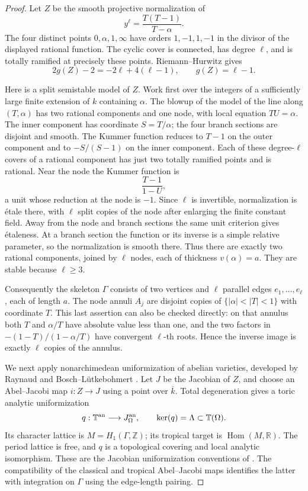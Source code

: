 \begin{proof}
Let $Z$ be the smooth projective normalization of
\[
 y^\ell=\frac{T(T-1)}{T-\alpha}.
\]
The four distinct points $0,\alpha,1,\infty$ have orders $1,-1,1,-1$
in the divisor of the displayed rational function. The cyclic cover
is connected, has degree $\ell$, and is totally ramified at precisely
these points. Riemann--Hurwitz gives
\[
 2g(Z)-2=-2\ell+4(\ell-1),\qquad g(Z)=\ell-1.
\]

Here is a split semistable model of $Z$. Work first over the integers
of a sufficiently large finite extension of $k$ containing $\alpha$.
The blowup of the model of the line along $(T,\alpha)$ has two rational
components and one node, with local equation $TU=\alpha$. The inner
component has coordinate $S=T/\alpha$; the four branch sections are
disjoint and smooth. The Kummer function reduces to $T-1$ on the outer
component and to $-S/(S-1)$ on the inner component. Each of these
degree-$\ell$ covers of a rational component has just two totally
ramified points and is rational. Near the node the Kummer function is
\[
 \frac{T-1}{1-U},
\]
a unit whose reduction at the node is $-1$. Since $\ell$ is invertible,
normalization is \'etale there, with $\ell$ split copies of the node
after enlarging the finite constant field. Away from the node and
branch sections the same unit criterion gives \'etaleness. At a branch
section the function or its inverse is a simple relative parameter,
so the normalization is smooth there. Thus there are exactly two
rational components, joined by $\ell$ nodes, each of thickness
$v(\alpha)=a$. They are stable because $\ell\ge3$.

Consequently the skeleton $\Gamma$ consists of two vertices and
$\ell$ parallel edges $e_1,\ldots,e_\ell$, each of length $a$.
The node annuli $A_j$ are disjoint copies of
$\{|\alpha|<|T|<1\}$ with coordinate $T$. This last assertion can also
be checked directly: on that annulus both $T$ and $\alpha/T$ have
absolute value less than one, and the two factors in
$-(1-T)/(1-\alpha/T)$ have convergent $\ell$-th roots. Hence the
inverse image is exactly $\ell$ copies of the annulus.

We next apply nonarchimedean uniformization of abelian varieties,
developed by Raynaud and Bosch--L\"utkebohmert
\cite{RaynaudUniformization,BoschLutkebohmert,BoschUniformization}.
Let $J$ be the Jacobian of $Z$, and choose an Abel--Jacobi map
$i:Z\to J$ using a point over $\overline{k}$. Total degeneration gives
a toric analytic uniformization
\[
 q:\mathbb T^{\rm an}\longrightarrow J_\Omega^{\rm an},
 \qquad \ker(q)=\Lambda\subset\mathbb T(\Omega).
\]
Its character lattice is $M=H_1(\Gamma,\mathbb Z)$; its tropical target
is $\operatorname{Hom}(M,\mathbb R)$. The period lattice is free, and
$q$ is a topological covering and local analytic isomorphism.
These are the Jacobian uniformization conventions of
\cite[Sections~4.1--4.2 and~4.5.2]{BakerRabinoff}. The compatibility of the classical
and tropical Abel--Jacobi maps \cite[Proposition~6.1 and Corollary~6.6]{BakerRabinoff} identifies the latter with integration
on $\Gamma$ using the edge-length pairing.


\end{proof}
